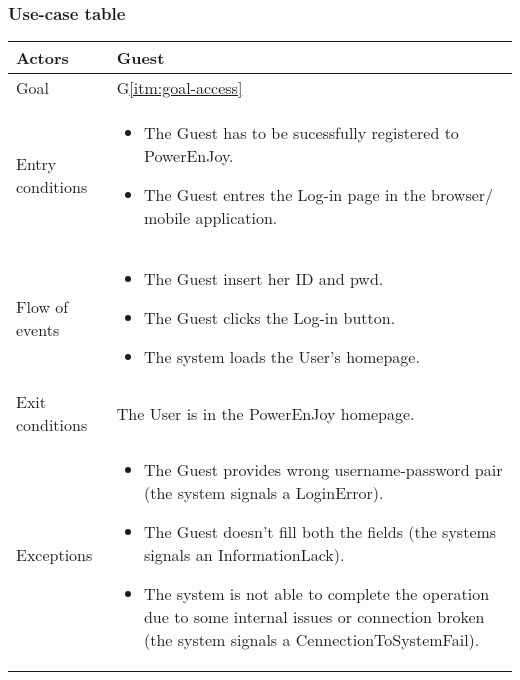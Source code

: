 \subsubsection{Use-case table}
\begin{center}
  \begin{tabular}{ l | p{10cm} }
    \hline
    Actors & Guest\\ \hline
    Goal & G\ref{itm:goal-access}\\ \hline
    Entry conditions & 
\begin{itemize}
\item The Guest has to be sucessfully registered to PowerEnJoy.
\item The Guest entres the Log-in page in the browser/ mobile application. 
\end{itemize} \\ \hline
    Flow of events &
\begin{itemize}
\item The Guest insert her \gls{ID} and \gls{pwd}.
\item The Guest clicks the Log-in button.
\item The system loads the User's homepage.
\end{itemize} \\ \hline
    Exit conditions & The User is in the PowerEnJoy homepage. \\ \hline
  Exceptions & 
\begin{itemize}
\item The Guest provides wrong username-password pair (the system signals a LoginError).
\item The Guest doesn't fill both the fields (the systems signals an InformationLack).
\item The system is not able to complete the operation due to some internal issues or connection broken (the system signals a CennectionToSystemFail).%
\end{itemize} \\ \hline
  \end{tabular}
\end{center}
